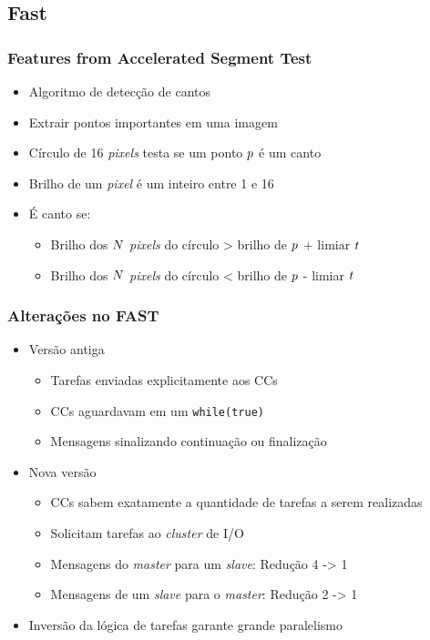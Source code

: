 \documentclass[xcolor={table}]{beamer}
\begin{document}
\subsection{Fast}
\begin{frame}\frametitle{Features from Accelerated Segment Test}
    \begin{itemize}
        \item {Algoritmo de detecção de cantos}
        \item {Extrair pontos importantes em uma imagem}
        \item {Círculo de 16 \textit{pixels} testa se um ponto $\mathnormal{p}$ é um canto}
        \item {Brilho de um \textit{pixel} é um inteiro entre 1 e 16}
        \item {É canto se:}
        \begin{itemize}
            \item {Brilho dos $\mathnormal{N}$ \textit{pixels} do círculo > brilho de $\mathnormal{p}$ + limiar $\mathnormal{t}$}
            \item {Brilho dos $\mathnormal{N}$ \textit{pixels} do círculo < brilho de $\mathnormal{p}$ - limiar $\mathnormal{t}$}
        \end{itemize}
    \end{itemize}
\end{frame}

\begin{frame}\frametitle{Alterações no FAST}
    \begin{itemize}
        \item {Versão antiga}
        \begin{itemize}
            \item {Tarefas enviadas explicitamente aos CCs}
            \item {CCs aguardavam em um \texttt{while(true)}}
            \item {Mensagens sinalizando continuação ou finalização}
        \end{itemize}
        \item {Nova versão}
        \begin{itemize}
            \item {CCs sabem exatamente a quantidade de tarefas a serem realizadas}
            \item {Solicitam tarefas ao \textit{cluster} de I/O}
            \item {Mensagens do \textit{master} para um \textit{slave}: Redução 4 -> 1}
            \item {Mensagens de um \textit{slave} para o \textit{master}: Redução 2 -> 1}
        \end{itemize}
        \item {Inversão da lógica de tarefas garante grande paralelismo}
    \end{itemize}
\end{frame}
\end{document}
